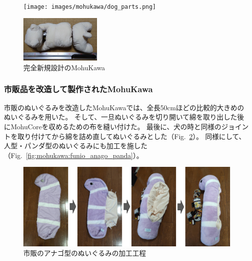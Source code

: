 \documentclass[uplatex,a4paper,12pt]{jsarticle}
\renewcommand{\figurename}{Fig.}
\newcommand{\figref}[1]{\figurename~\ref{#1}}
\begin{document}
\begin{figure}[htbp]
  \centering
  \begin{minipage}[c]{0.64\linewidth}
    \centering
    \texttt{[image: images/mohukawa/dog\_parts.png]}
  \end{minipage}
  \begin{minipage}[c]{0.32\linewidth}
    \centering
    \includegraphics[keepaspectratio,width=4cm,clip]{images/mohukawa/dog.jpg}
  \end{minipage}
  \caption{完全新規設計のMohuKawa}
  \label{fig:mohukawa:dog}
\end{figure}

\subsubsection{市販品を改造して製作されたMohuKawa}
市販のぬいぐるみを改造したMohuKawaでは、全長50cmほどの比較的大きめのぬいぐるみを用いた。
そして、一旦ぬいぐるみを切り開いて綿を取り出した後にMohuCoreを収めるための布を縫い付けた。
最後に、犬の時と同様のジョイントを取り付けてから綿を詰め直してぬいぐるみとした（\figref{fig:mohukawa:anago_making}）。
同様にして、人型・パンダ型のぬいぐるみにも加工を施した（\figref{fig:mohukawa:funio_anago_panda}）。
\begin{figure}[htbp]
  \centering
  \includegraphics[width=12cm]{images/mohukawa/anago_making.png}
  \caption{市販のアナゴ型のぬいぐるみの加工工程}
  \label{fig:mohukawa:anago_making}
\end{figure}
\end{document}
